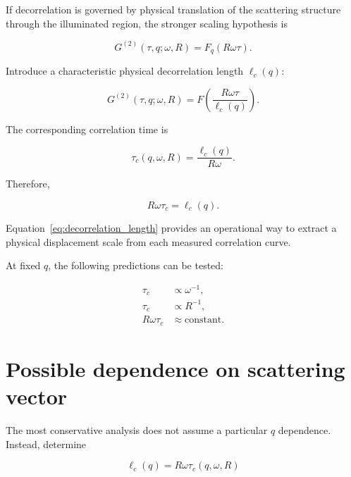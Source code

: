 \documentclass[11pt,letterpaper]{article}
\newcommand{\Gnorm}{G^{(2)}}
\begin{document}
If decorrelation is governed by physical translation of the scattering
structure through the illuminated region, the stronger scaling hypothesis is

\begin{equation}
    \boxed{
    \Gnorm(\tau,q;\omega,R)
    =
    F_q(R\omega\tau).
    }
    \label{eq:spatial_collapse}
\end{equation}

Introduce a characteristic physical decorrelation length $\ell_c(q)$:

\begin{equation}
    \boxed{
    \Gnorm(\tau,q;\omega,R)
    =
    F\left(
    \frac{R\omega\tau}{\ell_c(q)}
    \right).
    }
    \label{eq:general_collapse}
\end{equation}

The corresponding correlation time is

\begin{equation}
    \boxed{
    \tau_c(q,\omega,R)
    =
    \frac{\ell_c(q)}{R\omega}.
    }
    \label{eq:tau_general}
\end{equation}

Therefore,

\begin{equation}
    R\omega\tau_c=\ell_c(q).
    \label{eq:decorrelation_length}
\end{equation}

Equation~\eqref{eq:decorrelation_length} provides an operational way to
extract a physical displacement scale from each measured correlation curve.

At fixed $q$, the following predictions can be tested:

\begin{align}
    \tau_c &\propto \omega^{-1},\\
    \tau_c &\propto R^{-1},\\
    R\omega\tau_c &\approx \text{constant}.
\end{align}

\section{Possible dependence on scattering vector}

The most conservative analysis does not assume a particular $q$ dependence.
Instead, determine

\begin{equation}
    \ell_c(q)=R\omega\tau_c(q,\omega,R)
    \label{eq:ellq_empirical}
\end{equation}
\end{document}

